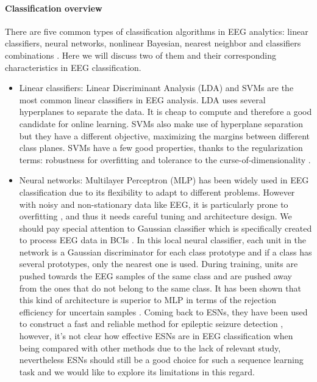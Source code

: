 \documentclass[a4paper,11pt,oneside]{article}
\begin{document}
\paragraph{Classification overview}
There are five common types of classification algorithms in EEG analytics: linear classifiers, neural networks, nonlinear Bayesian, nearest neighbor and classifiers combinations \cite{lotte2007review}. Here we will discuss two of them and their corresponding characteristics in EEG classification.

\begin{itemize}
	\item Linear classifiers: Linear Discriminant Analysis (LDA)  and SVMs are the most common linear classifiers in EEG analysis. LDA uses several hyperplanes to separate the data. It is cheap to compute and therefore a good candidate for online learning. SVMs also make use of hyperplane separation but they have a different objective, maximizing the margins between different class planes. SVMs have a few good properties, thanks to the regularization terms:  robustness for overfitting and tolerance to the curse-of-dimensionality \cite{bennett2000support}.
	
	\item Neural networks: Multilayer Perceptron (MLP)  has been widely used in EEG classification \cite{anderson1996classification}\cite{palaniappan2005brain} due to its flexibility to adapt to different problems. However with noisy and non-stationary data like EEG, it is particularly prone to overfitting \cite{balakrishnan2005multilayer}, and thus it needs careful tuning and architecture design. We should pay special attention to Gaussian classifier which is specifically created to process EEG data in BCIs \cite{millan2004noninvasive} \cite{millan2000local}. In this local neural classifier, each unit in the network is a Gaussian discriminator for each class prototype and if a class has several prototypes, only the nearest one is used. During training, units are pushed towards the EEG samples of the same class and are pushed away from the ones that do not belong to the same class. It has been shown that this kind of architecture is superior to MLP in terms of the rejection efficiency for uncertain samples \cite{millan2000local}. Coming back to ESNs,  they have been used to construct a fast and reliable method for epileptic seizure detection \cite{buteneers2008real}, however, it's not clear how effective ESNs are in EEG classification when being compared with other methods due to the lack of relevant study, nevertheless ESNs should still be a good choice for such a sequence learning task and we would like to explore its limitations in this regard.

\end{itemize}
\end{document}
